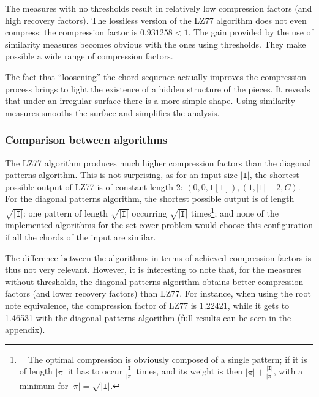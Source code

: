 \documentclass[a4paper,10pt]{article}
\newcommand{\guill}[1]{“#1”}
\begin{document}
The measures with no thresholds result in relatively low compression factors (and high recovery factors). The lossiless version of the LZ77 algorithm does not even compress: the compression factor is $0.931258<1$. The gain provided by the use of similarity measures becomes obvious with the ones using thresholds. They make possible a wide range of compression factors. 

The fact that \guill{loosening} the chord sequence actually improves the compression process brings to light the existence of a hidden structure of the pieces. It reveals that under an irregular surface there is a more simple shape. Using similarity measures smooths the surface and simplifies the analysis.


\subsubsection*{Comparison between algorithms}

The LZ77 algorithm produces much higher compression factors than the diagonal patterns algorithm. This is not surprising, as for an input size $|\texttt{I}|$, the shortest possible output of LZ77 is of constant length 2: $(0,0,\texttt{I}[1]),(1,|\texttt{I}|-2,C)$. For the diagonal patterns algorithm, the shortest possible output is of length $\sqrt{|\texttt{I}|}$: one pattern of length $\sqrt{|\texttt{I}|}$ occurring $\sqrt{|\texttt{I}|}$ times\footnote{~~The optimal compression is obviously composed of a single pattern; if it is of length $|\pi|$ it has to occur $\frac{|\texttt{I}|}{|\pi|}$ times, and its weight is then $|\pi|+\frac{|\texttt{I}|}{|\pi|}$, with a minimum for $|\pi|=\sqrt{|\texttt{I}|}$.}; 
and none of the implemented algorithms for the set cover problem would choose this configuration if all the chords of the input are similar.

The difference between the algorithms in terms of achieved compression factors is thus not very relevant. However, it is interesting to note that, for the measures without thresholds, the diagonal patterns algorithm obtains better compression factors (and lower recovery factors) than LZ77. For instance, when using the root note equivalence, the compression factor of LZ77 is 1.22421, while it gets to 1.46531 with the diagonal patterns algorithm (full results can be seen in the appendix).
\end{document}
